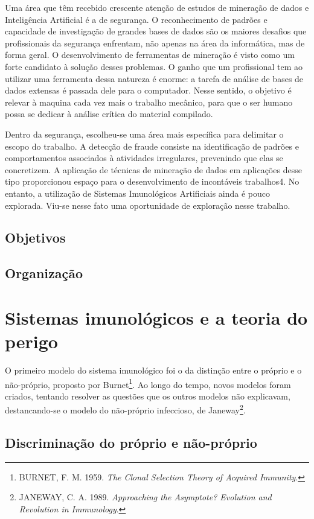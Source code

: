 \documentclass{iiufrgs}
\begin{document}
Uma área que têm recebido crescente atenção de estudos de mineração de dados e Inteligência Artificial é a de segurança. O reconhecimento de padrões e capacidade de investigação de grandes bases de dados são os maiores desafios que profissionais da segurança enfrentam, não apenas na área da informática, mas de forma geral. O desenvolvimento de ferramentas de mineração é visto como um forte candidato à solução desses problemas. O ganho que um profissional tem ao utilizar uma ferramenta dessa natureza é enorme: a tarefa de análise de bases de dados extensas é passada dele para o computador. Nesse sentido, o objetivo é relevar à maquina cada vez mais o trabalho mecânico, para que o ser humano possa se dedicar à análise crítica do material compilado.

Dentro da segurança, escolheu-se uma área mais específica para delimitar o escopo do trabalho. A detecção de fraude consiste na identificação de padrões e comportamentos associados à atividades irregulares, prevenindo que elas se concretizem. A aplicação de técnicas de mineração de dados em aplicações desse tipo proporcionou espaço para o desenvolvimento de incontáveis trabalhos4. No entanto, a utilização de Sistemas Imunológicos Artificiais ainda é pouco explorada. Viu-se nesse fato uma oportunidade de exploração nesse trabalho.

\section{Objetivos}
\section{Organização}

\chapter{Sistemas imunológicos e a teoria do perigo}

O primeiro modelo do sistema imunológico foi o da distinção entre o próprio e o não-próprio, proposto por Burnet\footnote{BURNET, F. M. 1959. \emph{The Clonal Selection Theory of Acquired Immunity}.}. Ao longo do tempo, novos modelos foram criados, tentando resolver as questões que os outros modelos não explicavam, destancando-se o modelo do não-próprio infeccioso, de Janeway\footnote{JANEWAY, C. A. 1989. \emph{Approaching the Asymptote? Evolution and Revolution in Immunology}.}.

\section{Discriminação do próprio e não-próprio}
\end{document}
